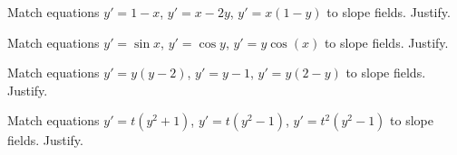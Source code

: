 \documentclass{ximera}
\begin{document}
\begin{exercise}
    Match equations $y'=1-x$, $y'=x-2y$, $y' = x(1-y)$ to slope fields. Justify.
    \begin{multipleChoice}
    \end{multipleChoice}
\end{exercise}


\begin{exercise}%
    Match equations $y'=\sin x$, $y'=\cos y$, $y' = y\cos(x)$ to slope fields. Justify.
    \begin{multipleChoice}
    \end{multipleChoice}
\end{exercise}

\begin{exercise}
    Match equations $y'=y(y-2)$, $y'=y-1$, $y' = y(2-y)$ to slope fields. Justify.
    \begin{multipleChoice}
    \end{multipleChoice}
\end{exercise}

\begin{exercise}
    Match equations $y'=t(y^2 + 1)$, $y'=t(y^2 - 1)$, $y' = t^2(y^2 - 1)$ to slope fields. Justify.
    \begin{multipleChoice}
    \end{multipleChoice}
\end{exercise}
\end{document}
